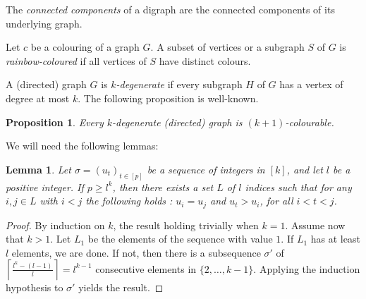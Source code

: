 \documentclass[utf8,10pt]{article}
\theoremstyle{plain}
\newtheorem{lemma}[theorem]{Lemma}
\newtheorem{proposition}[theorem]{Proposition}
\theoremstyle{definition}
\theoremstyle{remark}
\begin{document}
The {\it connected components} of a digraph are the connected components of its underlying graph.

Let $c$ be a colouring of a graph $G$. A subset of vertices or a subgraph $S$ of $G$ is {\it rainbow-coloured} if all vertices of $S$ have distinct colours.


A (directed) graph $G$ is {\it $k$-degenerate} if every subgraph $H$ of $G$ has a vertex of degree at most $k$.
The following proposition is well-known.
\begin{proposition}\label{prop:deg}
Every $k$-degenerate (directed) graph is $(k+1)$-colourable.
\end{proposition}





We will need the following lemmas:

%
%

\begin{lemma}\label{min}
Let $\sigma=(u_t)_{t\in [p]}$ be a sequence of integers in $[k]$, and let $l$ be a positive integer. If $p\geq l^k$, then there exists a set $L$ of $l$ indices such that for any $i,j \in L$ with $i < j$ the following holds : $u_i=u_j$ and $u_t > u_i$, for all $i < t < j$. \end{lemma}

\begin{proof}
By induction on $k$, the result holding trivially when $k=1$. Assume now that $k>1$. Let $L_1$ be the elements of the sequence with value $1$. If $L_1$ has at least $l$ elements, we are done.
If not, then there is a subsequence $\sigma'$ of $\left\lceil \frac{l^k-(l-1)}{l}\right \rceil = l^{k-1}$ consecutive elements in $\{2, \dots , k-1\}$. Applying the induction hypothesis to $\sigma'$ yields the result.
\end{proof}
\end{document}
